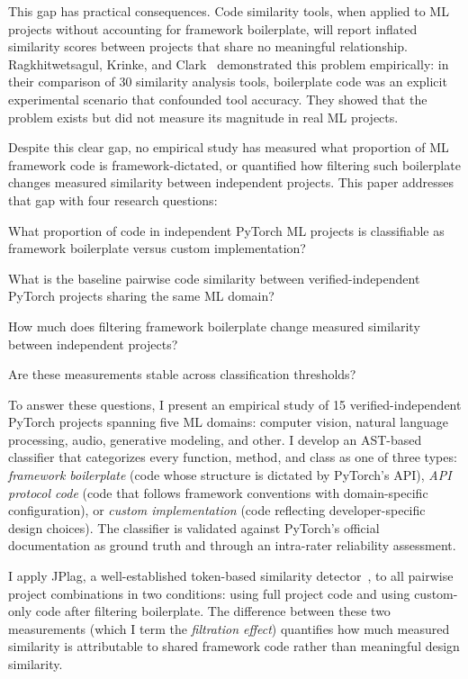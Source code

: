 \documentclass[smallextended,natbib]{svjour3}
\begin{document}
This gap has practical consequences. Code similarity tools, when applied to ML projects without accounting for framework boilerplate, will report inflated similarity scores between projects that share no meaningful relationship. Ragkhitwetsagul, Krinke, and Clark~\citep{ragkhitwetsagul2018} demonstrated this problem empirically: in their comparison of 30 similarity analysis tools, boilerplate code was an explicit experimental scenario that confounded tool accuracy. They showed that the problem exists but did not measure its magnitude in real ML projects.

Despite this clear gap, no empirical study has measured what proportion of ML framework code is framework-dictated, or quantified how filtering such boilerplate changes measured similarity between independent projects. This paper addresses that gap with four research questions:

\begin{description}[leftmargin=1cm]
\item[RQ1:] What proportion of code in independent PyTorch ML projects is classifiable as framework boilerplate versus custom implementation?
\item[RQ2:] What is the baseline pairwise code similarity between verified-independent PyTorch projects sharing the same ML domain?
\item[RQ3:] How much does filtering framework boilerplate change measured similarity between independent projects?
\item[RQ4:] Are these measurements stable across classification thresholds?
\end{description}

To answer these questions, I present an empirical study of 15 verified-independent PyTorch projects spanning five ML domains: computer vision, natural language processing, audio, generative modeling, and other. I develop an AST-based classifier that categorizes every function, method, and class as one of three types: \emph{framework boilerplate} (code whose structure is dictated by PyTorch's API), \emph{API protocol code} (code that follows framework conventions with domain-specific configuration), or \emph{custom implementation} (code reflecting developer-specific design choices). The classifier is validated against PyTorch's official documentation as ground truth and through an intra-rater reliability assessment.

I apply JPlag, a well-established token-based similarity detector~\citep{jplag2000}, to all pairwise project combinations in two conditions: using full project code and using custom-only code after filtering boilerplate. The difference between these two measurements (which I term the \emph{filtration effect}) quantifies how much measured similarity is attributable to shared framework code rather than meaningful design similarity.
\end{document}
